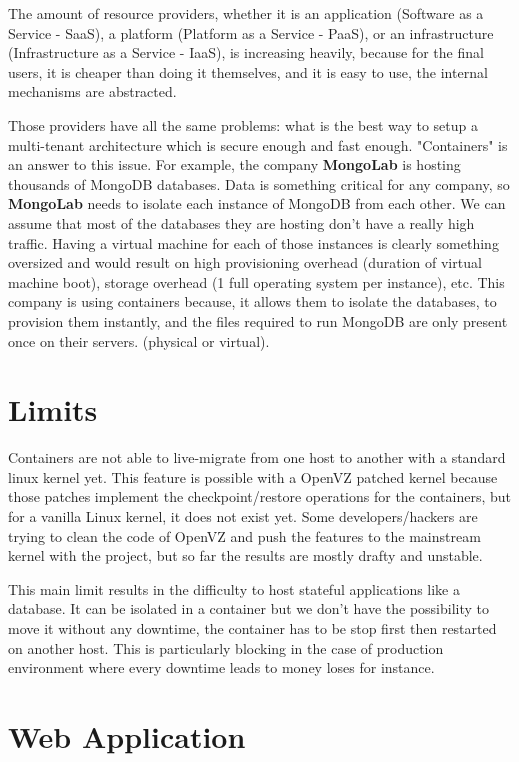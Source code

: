 The amount of resource providers, whether it is an application (Software as a
Service - SaaS), a platform (Platform as a Service - PaaS), or an
infrastructure (Infrastructure as a Service - IaaS), is increasing heavily,
because for the final users, it is cheaper than doing it themselves, and it is
easy to use, the internal mechanisms are abstracted.

Those providers have all the same problems: what is the best way to setup a
multi-tenant architecture which is secure enough and fast enough. "Containers"
is an answer to this issue. For example, the company \textbf{MongoLab} is hosting
thousands of MongoDB databases. Data is something critical for any company, so
\textbf{MongoLab} needs to isolate each instance of MongoDB from each other.
We can assume that most of the databases they are hosting don't have a really high
traffic. Having a virtual machine for each of those instances is clearly something
oversized and would result on high provisioning overhead (duration of virtual
machine boot), storage overhead (1 full operating system per instance), etc.
This company is using containers because, it allows them to isolate the databases,
to provision them instantly, and the files required to run MongoDB are
only present once on their servers. (physical or virtual).

\section{Limits}

Containers are not able to live-migrate from one host to another with a
standard linux kernel yet. This feature is possible with a OpenVZ patched
kernel because those patches implement the checkpoint/restore operations for
the containers, but for a vanilla Linux kernel, it does not exist yet. Some
developers/hackers are trying to clean the code of OpenVZ and push the features
to the mainstream kernel with the \cite{websiteCRIU} project, but so far the
results are mostly drafty and unstable.

This main limit results in the difficulty to host stateful applications like a
database. It can be isolated in a container but we don't have the possibility
to move it without any downtime, the container has to be stop first then
restarted on another host. This is particularly blocking in the case of
production environment where every downtime leads to money loses for instance.

\section{Web Application}

